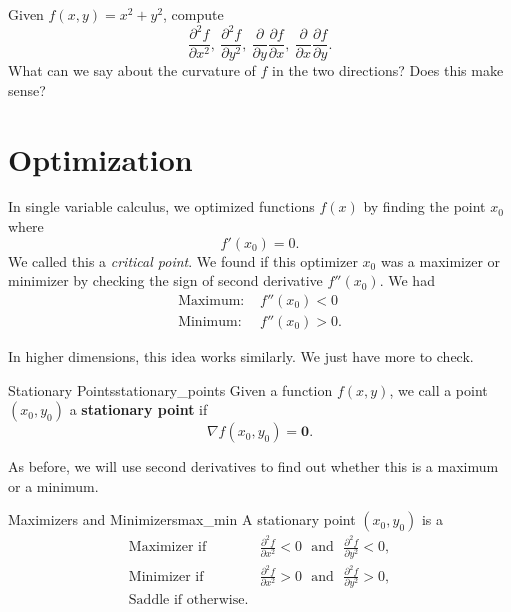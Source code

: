         \begin{exercise}
        Given $f(x,y)=x^2+y^2$, compute
        \[
        \frac{\partial^2 f}{\partial x^2}, ~ \frac{\partial^2 f}{\partial y^2}, ~ \frac{\partial}{\partial y}\frac{\partial f}{\partial x},~ \frac{\partial}{\partial x}\frac{\partial f}{\partial y}.
        \]
        What can we say about the curvature of $f$ in the two directions? Does this make sense?
        \end{exercise}
        
        \section{Optimization}
        In single variable calculus, we optimized functions $f(x)$ by finding the point $x_0$ where 
        \[
        f'(x_0)=0.
        \]
        We called this a \emph{critical point}. We found if this optimizer $x_0$ was a maximizer or minimizer by checking the sign of second derivative $f''(x_0)$. We had
        \begin{align*}
            \textrm{Maximum: }& f''(x_0)<0\\
            \textrm{Minimum: }& f''(x_0)>0.
        \end{align*}
        
        In higher dimensions, this idea works similarly. We just have more to check. 
        
        \begin{df}{Stationary Points}{stationary_points}
        Given a function $f(x,y)$, we call a point $(x_0,y_0)$ a \textbf{stationary point} if 
        \[
        \nabla f(x_0,y_0) = \mathbf{0}.
        \]
        \end{df}
        
        As before, we will use second derivatives to find out whether this is a maximum or a minimum.
        
        \begin{prop}{Maximizers and Minimizers}{max_min}
        A stationary point $(x_0,y_0)$ is a 
        \begin{align*}
            \textrm{Maximizer if~ }& \frac{\partial^2 f}{\partial x^2} <0 \textrm{ ~and~ } \frac{\partial^2 f}{\partial y^2}<0,\\
            \textrm{Minimizer if~ }& \frac{\partial^2 f}{\partial x^2} >0 \textrm{ ~and~ } \frac{\partial^2 f}{\partial y^2}>0,\\
            \textrm{Saddle if otherwise.}
        \end{align*}
        \end{prop}
        
